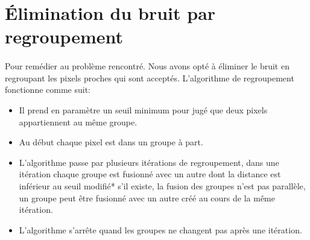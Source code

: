 \documentclass[12pt]{report}
\begin{document}
\section{Élimination du bruit par regroupement}
\paragraph{}Pour remédier au problème rencontré. Nous avons opté à éliminer le bruit en regroupant les pixels proches qui sont acceptés. L’algorithme de regroupement fonctionne comme suit:
\begin{itemize}
	\item Il prend en paramètre un seuil minimum pour jugé que deux pixels appartiennent au même groupe.
	
	\item Au début chaque pixel est dans un groupe à part.
	
	\item L’algorithme passe par plusieurs itérations de regroupement, dans une itération chaque groupe est fusionné avec un autre dont la distance est inférieur au seuil modifié* s'il existe, la fusion des groupes n'est pas parallèle, un groupe peut être fusionné avec un autre créé au cours de la même itération.
	
	\item L’algorithme s’arrête quand les groupes ne changent pas après une itération.
\end{itemize}
\end{document}
